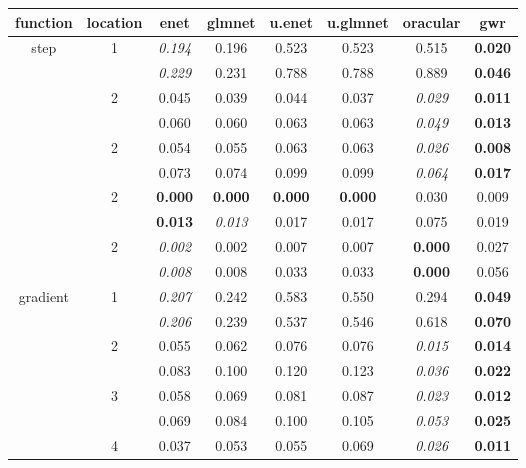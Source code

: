 \documentclass[authoryear, review, 11pt]{elsarticle}
\begin{document}
\begin{table}
\thispagestyle{empty}
\begin{center}
\begin{tabular}{cccccccc}
 function & location & enet & glmnet & u.enet & u.glmnet & oracular & gwr \\ 
  \hline
  \multirow{10}{*}{step} & \multirow{2}{*}{1} & \emph{0.194} & 0.196 & 0.523 & 0.523 & 0.515 & \textbf{0.020} \\ 
   &  & \emph{0.229} & 0.231 & 0.788 & 0.788 & 0.889 & \textbf{0.046} \\ 
   \cline{3-8}
   & \multirow{2}{*}{2} & 0.045 & 0.039 & 0.044 & 0.037 & \emph{0.029} & \textbf{0.011} \\ 
   &  & 0.060 & 0.060 & 0.063 & 0.063 & \emph{0.049} & \textbf{0.013} \\ 
   \cline{3-8}
   & \multirow{2}{*}{2} & 0.054 & 0.055 & 0.063 & 0.063 & \emph{0.026} & \textbf{0.008} \\ 
   &  & 0.073 & 0.074 & 0.099 & 0.099 & \emph{0.064} & \textbf{0.017} \\ 
   \cline{3-8}
   & \multirow{2}{*}{2} & \textbf{0.000} & \textbf{0.000} & \textbf{0.000} & \textbf{0.000} & 0.030 & 0.009 \\ 
   &  & \textbf{0.013} & \emph{0.013} & 0.017 & 0.017 & 0.075 & 0.019 \\ 
   \cline{3-8}
   & \multirow{2}{*}{2} & \emph{0.002} & 0.002 & 0.007 & 0.007 & \textbf{0.000} & 0.027 \\ 
   &  & \emph{0.008} & 0.008 & 0.033 & 0.033 & \textbf{0.000} & 0.056 \\ 
   \hline
  \multirow{10}{*}{gradient} & \multirow{2}{*}{1} & \emph{0.207} & 0.242 & 0.583 & 0.550 & 0.294 & \textbf{0.049} \\ 
   &  & \emph{0.206} & 0.239 & 0.537 & 0.546 & 0.618 & \textbf{0.070} \\ 
   \cline{3-8}
   & \multirow{2}{*}{2} & 0.055 & 0.062 & 0.076 & 0.076 & \emph{0.015} & \textbf{0.014} \\ 
   &  & 0.083 & 0.100 & 0.120 & 0.123 & \emph{0.036} & \textbf{0.022} \\ 
   \cline{3-8}
   & \multirow{2}{*}{3} & 0.058 & 0.069 & 0.081 & 0.087 & \emph{0.023} & \textbf{0.012} \\ 
   &  & 0.069 & 0.084 & 0.100 & 0.105 & \emph{0.053} & \textbf{0.025} \\ 
   \cline{3-8}
   & \multirow{2}{*}{4} & 0.037 & 0.053 & 0.055 & 0.069 & \emph{0.026} & \textbf{0.011} \\ 

\end{tabular}
\end{center}
\end{table}
\end{document}
